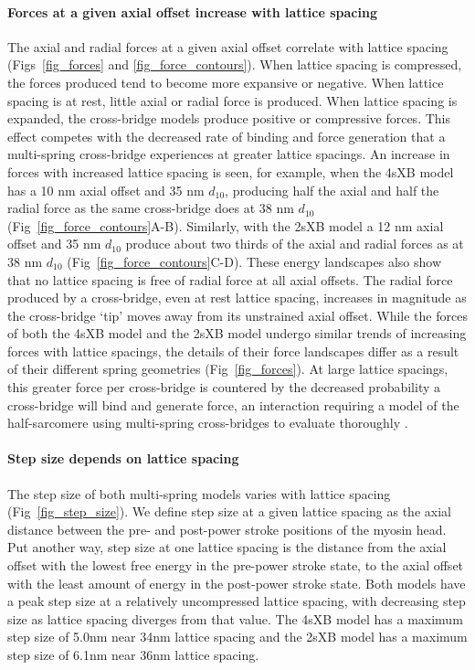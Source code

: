 \documentclass[10pt]{article}
\newcommand{\citep}[1]{\cite{#1}} %
\begin{document}
\paragraph{Forces at a given axial offset increase with lattice spacing} %
The axial and radial forces at a given axial offset correlate with lattice spacing (Figs~\ref{fig_forces} and \ref{fig_force_contours}).
When lattice spacing is compressed, the forces produced tend to become more expansive or negative. 
When lattice spacing is at rest, little axial or radial force is produced. 
When lattice spacing is expanded, the cross-bridge models produce positive or compressive forces. 
This effect competes with the decreased rate of binding and force generation that a multi-spring cross-bridge experiences at greater lattice spacings. 
An increase in forces with increased lattice spacing is seen, for example, when the 4sXB model has a 10 nm axial offset and 35 nm $d_{10}$, producing half the axial and half the radial force as the same cross-bridge does at 38 nm $d_{10}$ (Fig~\ref{fig_force_contours}A-B). 
Similarly, with the 2sXB model a 12 nm axial offset and 35 nm $d_{10}$ produce about two thirds of the axial and radial forces as at 38 nm $d_{10}$ (Fig~\ref{fig_force_contours}C-D).  
These energy landscapes also show that no lattice spacing is free of radial force at all axial offsets.  
The radial force produced by a cross-bridge, even at rest lattice spacing, increases in magnitude as the cross-bridge `tip' moves away from its unstrained axial offset. 
While the forces of both the 4sXB model and the 2sXB model undergo similar trends of increasing forces with lattice spacings, the details of their force landscapes differ as a result of their different spring geometries (Fig~\ref{fig_forces}). 
At large lattice spacings, this greater force per cross-bridge is countered by the decreased probability a cross-bridge will bind and generate force, an interaction requiring a model of the half-sarcomere using multi-spring cross-bridges to evaluate thoroughly \citep{Martyn2004}. 

\paragraph{Step size depends on lattice spacing} %
The step size of both multi-spring models varies with lattice spacing (Fig~\ref{fig_step_size}). 
We define step size at a given lattice spacing as the axial distance between the pre- and post-power stroke positions of the myosin head. 
Put another way, step size at one lattice spacing is the distance from the axial offset with the lowest free energy in the pre-power stroke state, to the axial offset with the least amount of energy in the post-power stroke state. 
Both models have a peak step size at a relatively uncompressed lattice spacing, with decreasing step size as lattice spacing diverges from that value. 
The 4sXB model has a maximum step size of 5.0nm near 34nm lattice spacing and the 2sXB model has a maximum step size of 6.1nm near 36nm lattice spacing. 
\end{document}

